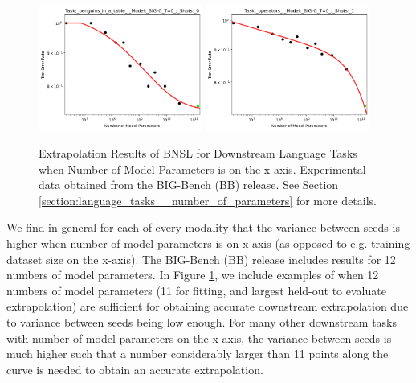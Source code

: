 \documentclass{article} %
\begin{document}
\begin{figure}[htbp]
    \centering
\includegraphics[width=0.48\textwidth]{figures/big_bench__parameter_scalling/penguins_in_a_table___BIG-G_T=0___0.png}
\includegraphics[width=0.48\textwidth]{figures/big_bench__parameter_scalling/operators___BIG-G_T=0___1.png}
    \caption{
Extrapolation Results of BNSL for Downstream Language Tasks when Number of Model Parameters is on the x-axis. Experimental data obtained from the BIG-Bench (BB) \citep{srivastava2022beyond} release.
See Section \ref{section:language_tasks__number_of_parameters} for more details.
    }
    \label{fig:language_tasks__number_of_parameters}
\end{figure}

We find in general for each of every modality that the variance between seeds is higher when number of model parameters is on x-axis (as opposed to e.g. training dataset size on the x-axis). The BIG-Bench (BB) \citep{srivastava2022beyond} release includes results for 12 numbers of model parameters. In Figure \ref{fig:language_tasks__number_of_parameters}, we include examples of when 12 numbers of model parameters (11 for fitting, and largest held-out to evaluate extrapolation)
are sufficient for obtaining accurate downstream extrapolation due to variance between seeds being low enough. For many other downstream tasks with number of model parameters on the x-axis, the variance between seeds is much higher such that a number considerably larger than 11 points along the curve is needed to obtain an accurate extrapolation.
\end{document}
